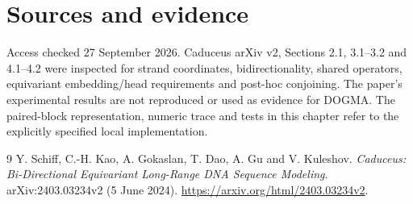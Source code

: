 \section*{Sources and evidence}
Access checked 27 September 2026. Caduceus arXiv v2, Sections 2.1, 3.1--3.2
and 4.1--4.2 were inspected for strand coordinates, bidirectionality, shared
operators, equivariant embedding/head requirements and post-hoc conjoining.
The paper's experimental results are not reproduced or used as evidence for
DOGMA. The paired-block representation, numeric trace and tests in this chapter
refer to the explicitly specified local implementation.
\begingroup\let\chapter\section
\begin{thebibliography}{9}
 Y. Schiff, C.-H. Kao, A. Gokaslan, T. Dao,
A. Gu and V. Kuleshov.
\emph{Caduceus: Bi-Directional Equivariant Long-Range DNA Sequence Modeling}.
arXiv:2403.03234v2 (5 June 2024).
\url{https://arxiv.org/html/2403.03234v2}.
\end{thebibliography}\endgroup

